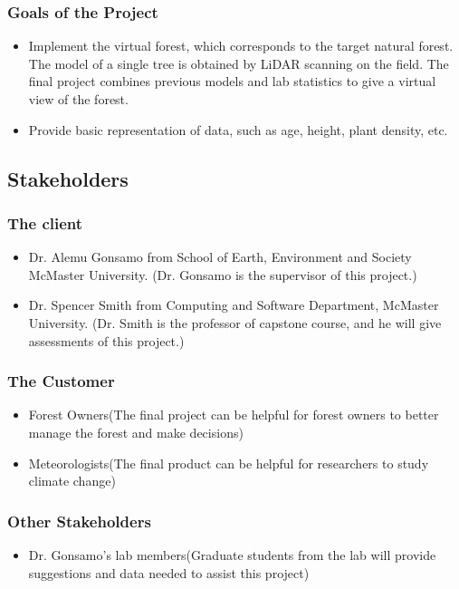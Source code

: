 \documentclass{article}
\begin{document}
\subsubsection{Goals of the Project}
\begin{itemize}
    \item Implement the virtual forest, which corresponds to the target natural forest. The model of a single tree is obtained by LiDAR scanning on the field. The final project combines previous models and lab statistics to give a virtual view of the forest. 
    \item Provide basic representation of data, such as age, height, plant density, 
    etc. 
\end{itemize}

\subsection{Stakeholders}
\subsubsection{The client}
\begin{itemize}
    \item Dr. Alemu Gonsamo from School of Earth, Environment and Society McMaster University. (Dr. Gonsamo is the supervisor of this project.)
    \item Dr. Spencer Smith from Computing and Software Department, McMaster University. (Dr. 
    Smith is the professor of capstone course, and he will give assessments of this project.)
\end{itemize}
\subsubsection{The Customer}
\begin{itemize}
    \item Forest Owners(The final project can be helpful for forest owners to better manage the 
    forest and make decisions)
    \item Meteorologists(The final product can be helpful for researchers to 
    study climate change)
\end{itemize}
\subsubsection{Other Stakeholders}
\begin{itemize}
    \item Dr. Gonsamo's lab members(Graduate students from the lab will provide suggestions and
    data needed to assist this project)
\end{itemize}
\end{document}
